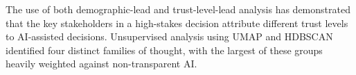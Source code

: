 \documentclass[manuscript,screen,review]{acmart}
\begin{document}



The use of both demographic-lead and trust-level-lead analysis has demonstrated that the key stakeholders in a high-stakes decision attribute different trust levels to AI-assisted decisions. Unsupervised analysis using UMAP and HDBSCAN identified four distinct families of thought, with the largest of these groups heavily weighted against non-transparent AI. 
\end{document}
